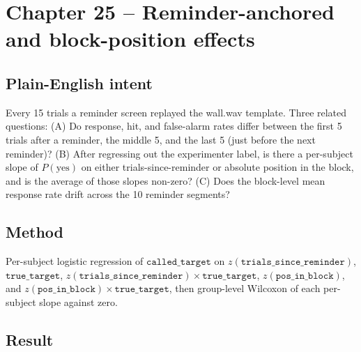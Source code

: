 \documentclass[11pt]{article}
\begin{document}
\clearpage

\section{Chapter 25 -- Reminder-anchored and block-position effects}

\subsection{Plain-English intent}

Every 15 trials a reminder screen replayed the wall.wav template. Three
related questions:
(A) Do response, hit, and false-alarm rates differ between the first 5
trials after a reminder, the middle 5, and the last 5 (just before the
next reminder)?
(B) After regressing out the experimenter label, is there a per-subject
slope of $P(\text{yes})$ on either trials-since-reminder or absolute
position in the block, and is the average of those slopes non-zero?
(C) Does the block-level mean response rate drift across the 10
reminder segments?

\subsection{Method}

Per-subject logistic regression of $\texttt{called\_target}$ on
$z(\texttt{trials\_since\_reminder})$,
$\texttt{true\_target}$,
$z(\texttt{trials\_since\_reminder})\times\texttt{true\_target}$,
$z(\texttt{pos\_in\_block})$, and
$z(\texttt{pos\_in\_block})\times\texttt{true\_target}$,
then group-level Wilcoxon of each per-subject slope against zero.

\subsection{Result}
\end{document}
